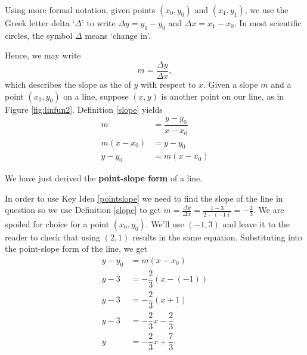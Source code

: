 

Using more formal notation, given points $\left(x_{0}, y_{0}\right)$ and $\left(x_{1}, y_{1}\right)$, we use the Greek letter delta `$\Delta$' to write $\Delta y = y_{1} - y_{0}$ and $\Delta x = x_{1} - x_{0}$.  In most scientific circles, the symbol $\Delta$ means `change in'.  

\smallskip

Hence, we may write \[ m = \dfrac{\Delta y}{\Delta x},\] which describes the slope as the  of $y$ with respect to $x$.  
Given a slope $m$ and a point $(x_0,y_0)$ on a line, suppose $(x,y)$ is another point on our line, as in Figure \ref{fig:linfun2}.
Definition \ref{slope} yields
\begin{align*} 
	m & = \dfrac{y - y_{0}}{x-x_{0}} \\
	m\left(x - x_{0}\right) & =  y - y_{0} \\
	y - y_{0} & = m\left(x - x_{0}\right)
\end{align*}

We have just derived the \textbf{point-slope form} of a line.



\smallskip


\medskip


{
In order to use Key Idea \ref{pointslope} we need to find the slope of the line in question so we use Definition \ref{slope} to get $m = \frac{\Delta y}{\Delta x} = \frac{1 - 3}{2 - (-1)} = -\frac{2}{3}$.  We are spoiled for choice for a point $\left(x_{0}, y_{0}\right)$. We'll use $(-1,3)$ and leave it to the reader to check that using $(2,1)$ results in the same equation.  Substituting into the point-slope form of the line, we get 
\begin{align*}
	y - y_{0} & = m\left(x - x_{0}\right)\\
	y - 3 & =  -\dfrac{2}{3} \left(x - (-1)\right)\\[2pt]
	y - 3 & =  -\dfrac{2}{3} \left(x +1 \right)\\[2pt]
	y - 3 & =  -\dfrac{2}{3}x - \dfrac{2}{3}\\[2pt]
	y     & =  -\dfrac{2}{3} x + \dfrac{7}{3}. 
\end{align*}
}

